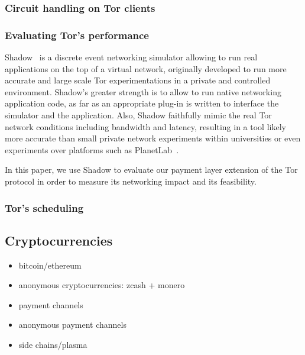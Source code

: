 \subsubsection{Circuit handling on Tor clients}

\subsubsection{Evaluating Tor's performance}
Shadow~\cite{shadow-ndss12} is a discrete event networking simulator allowing to run real applications on the top of a virtual network, originally developed to run more accurate and large scale Tor experimentations in a private and controlled environment. Shadow's greater strength is to allow to run native networking application code, as far as an appropriate plug-in is written to interface the simulator and the application. Also, Shadow faithfully mimic the real Tor network conditions including bandwidth and latency, resulting in a tool likely more accurate than small private network experiments within universities or even experiments over platforms such as PlanetLab~\cite{Chun:2003:POT:956993.956995}.

In this paper, we use Shadow to evaluate our payment layer extension of the Tor protocol in order to measure its networking impact and its feasibility.
\subsubsection{Tor's scheduling}


\subsection{Cryptocurrencies}

\begin{itemize}
\item bitcoin/ethereum~\cite{nakamoto2008bitcoin}~\cite{wood2014ethereum}
\item anonymous cryptocurrencies: zcash + monero
\item payment channels
\item anonymous payment channels
\item side chains/plasma
\end{itemize}

